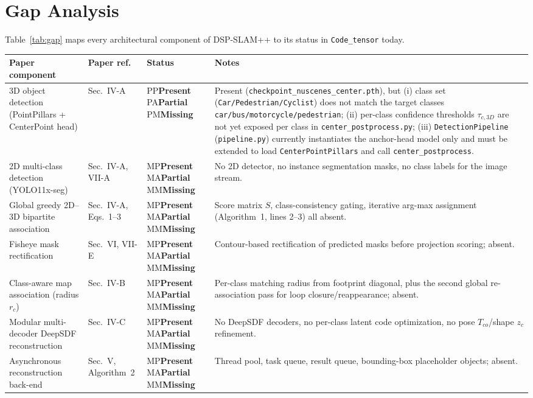\documentclass[11pt]{article}
\newcommand{\status}[1]{%
  \ifx#1P\textcolor{blue!60!black}{\textbf{Present}}\fi
  \ifx#1A\textcolor{orange!80!black}{\textbf{Partial}}\fi
  \ifx#1M\textcolor{red!70!black}{\textbf{Missing}}\fi
}
\begin{document}
\section{Gap Analysis}

Table~\ref{tab:gap} maps every architectural component of DSP-SLAM++ to its status in \texttt{Code\_tensor} today.

\begin{longtable}{p{4.1cm}p{1.6cm}p{1.5cm}p{6.3cm}}
\toprule
\textbf{Paper component} & \textbf{Paper ref.} & \textbf{Status} & \textbf{Notes} \\
\midrule
\endhead
3D object detection (PointPillars + CenterPoint head) & Sec.~IV-A & \status{P} & Present (\texttt{checkpoint\_nuscenes\_center.pth}), but (i) class set (\texttt{Car/Pedestrian/Cyclist}) does not match the target classes \texttt{car/bus/motorcycle/pedestrian}; (ii) per-class confidence thresholds $\tau_{c,3D}$ are not yet exposed per class in \texttt{center\_postprocess.py}; (iii) \texttt{DetectionPipeline} (\texttt{pipeline.py}) currently instantiates the anchor-head model only and must be extended to load \texttt{CenterPointPillars} and call \texttt{center\_postprocess}. \\
2D multi-class detection (YOLO11x-seg) & Sec.~IV-A, VII-A & \status{M} & No 2D detector, no instance segmentation masks, no class labels for the image stream. \\
Global greedy 2D--3D bipartite association & Sec.~IV-A, Eqs.~1--3 & \status{M} & Score matrix $S$, class-consistency gating, iterative arg-max assignment (Algorithm~1, lines 2--3) all absent. \\
Fisheye mask rectification & Sec.~VI, VII-E & \status{M} & Contour-based rectification of predicted masks before projection scoring; absent. \\
Class-aware map association (radius $r_c$) & Sec.~IV-B & \status{M} & Per-class matching radius from footprint diagonal, plus the second global re-association pass for loop closure/reappearance; absent. \\
Modular multi-decoder DeepSDF reconstruction & Sec.~IV-C & \status{M} & No DeepSDF decoders, no per-class latent code optimization, no pose $T_{co}$/shape $z_c$ refinement. \\
Asynchronous reconstruction back-end & Sec.~V, Algorithm~2 & \status{M} & Thread pool, task queue, result queue, bounding-box placeholder objects; absent. \\

\end{longtable}
\end{document}

